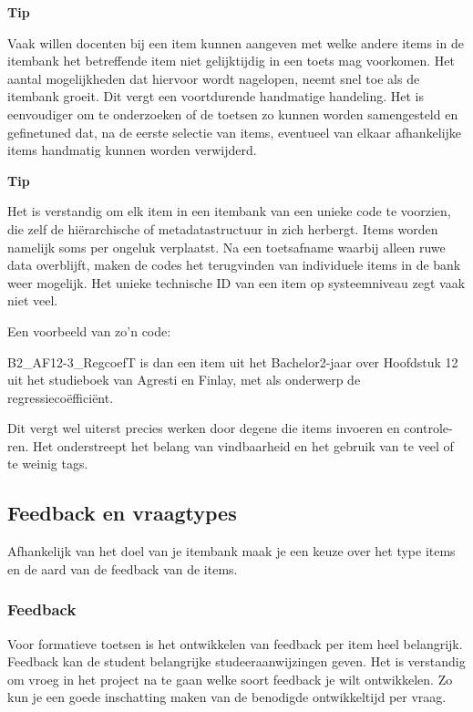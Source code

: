 \documentclass[
]{book}
\begin{document}
\textbf{Tip}

Vaak willen docenten bij een item kunnen aangeven met welke andere items in de itembank het betreffende item niet gelijktijdig in een toets mag voorkomen. Het aantal mogelijkheden dat hiervoor wordt nagelopen, neemt snel toe als de itembank groeit. Dit vergt een voortdurende handmatige handeling. Het is eenvoudiger om te onderzoeken of de toetsen zo kunnen worden samengesteld en gefinetuned dat, na de eerste selectie van items, eventueel van elkaar afhankelijke items handmatig kunnen worden verwijderd.

\textbf{Tip}

Het is verstandig om elk item in een itembank van een unieke code te voorzien, die zelf de hiërarchische of metadatastructuur in zich herbergt. Items worden namelijk soms per ongeluk verplaatst. Na een toetsafname waarbij alleen ruwe data overblijft, maken de codes het terugvinden van individuele items in de bank weer mogelijk. Het unieke technische ID van een item op systeemniveau zegt vaak niet veel.

Een voorbeeld van zo'n code:

B2\_AF12-3\_RegcoefT is dan een item uit het Bachelor2-jaar over Hoofdstuk 12 uit het studieboek van Agresti en Finlay, met als onderwerp de regressiecoëfficiënt.

Dit vergt wel uiterst precies werken door degene die items invoeren en controle- ren. Het onderstreept het belang van vindbaarheid en het gebruik van te veel of te weinig tags.

\hypertarget{feedback-en-vraagtypes}{%
\subsection{Feedback en vraagtypes}\label{feedback-en-vraagtypes}}

Afhankelijk van het doel van je itembank maak je een keuze over het type items en de aard van de feedback van de items.

\hypertarget{feedback}{%
\subsubsection{Feedback}\label{feedback}}

Voor formatieve toetsen is het ontwikkelen van feedback per item heel belangrijk. Feedback kan de student belangrijke studeeraanwijzingen geven. Het is verstandig om vroeg in het project na te gaan welke soort feedback je wilt ontwikkelen. Zo kun je een goede inschatting maken van de benodigde ontwikkeltijd per vraag.
\end{document}
